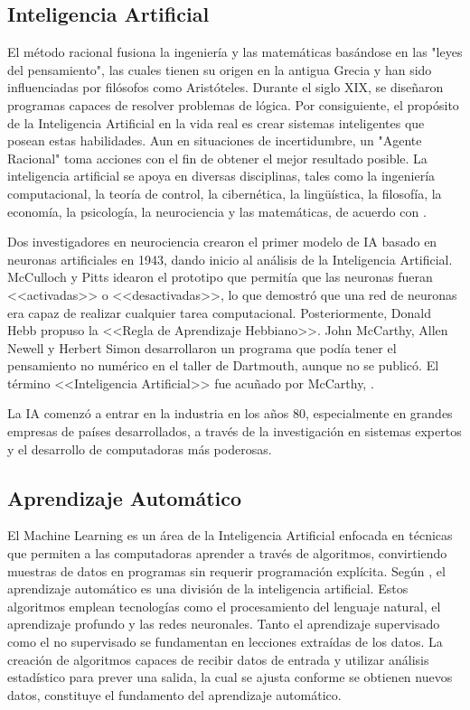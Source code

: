 \subsection{Inteligencia Artificial}

El método racional fusiona la ingeniería y las matemáticas basándose en las "leyes del pensamiento", las cuales tienen su origen en la antigua Grecia y han sido influenciadas por filósofos como Aristóteles. Durante el siglo XIX, se diseñaron programas capaces de resolver problemas de lógica. Por consiguiente, el propósito de la Inteligencia Artificial en la vida real es crear sistemas inteligentes que posean estas habilidades. Aun en situaciones de incertidumbre, un "Agente Racional" toma acciones con el fin de obtener el mejor resultado posible. La inteligencia artificial se apoya en diversas disciplinas, tales como la ingeniería computacional, la teoría de control, la cibernética, la lingüística, la filosofía, la economía, la psicología, la neurociencia y las matemáticas, de acuerdo con \cite{bk_russell2004intart}.

Dos investigadores en neurociencia crearon el primer modelo de IA basado en neuronas artificiales en 1943, dando inicio al análisis de la Inteligencia Artificial. McCulloch y Pitts idearon el prototipo que permitía que las neuronas fueran <<activadas>> o <<desactivadas>>, lo que demostró que una red de neuronas era capaz de realizar cualquier tarea computacional. Posteriormente, Donald Hebb propuso la <<Regla de Aprendizaje Hebbiano>>. John McCarthy, Allen Newell y Herbert Simon desarrollaron un programa que podía tener el pensamiento no numérico en el taller de Dartmouth, aunque no se publicó. El término <<Inteligencia Artificial>> fue acuñado por McCarthy, \parencite{bk_russell2004intart}.

La IA comenzó a entrar en la industria en los años 80, especialmente en grandes empresas de países desarrollados, a través de la investigación en sistemas expertos y el desarrollo de computadoras más poderosas.

\subsection{Aprendizaje Automático}
El Machine Learning es un área de la Inteligencia Artificial enfocada en técnicas que permiten a las computadoras aprender a través de algoritmos, convirtiendo muestras de datos en programas sin requerir programación explícita. Según \cite{bk_russell2009intart}, el aprendizaje automático es una división de la inteligencia artificial. Estos algoritmos emplean tecnologías como el procesamiento del lenguaje natural, el aprendizaje profundo y las redes neuronales. Tanto el aprendizaje supervisado como el no supervisado se fundamentan en lecciones extraídas de los datos. La creación de algoritmos capaces de recibir datos de entrada y utilizar análisis estadístico para prever una salida, la cual se ajusta conforme se obtienen nuevos datos, constituye el fundamento del aprendizaje automático. \parencite{bk_alpaydin2014ml}

